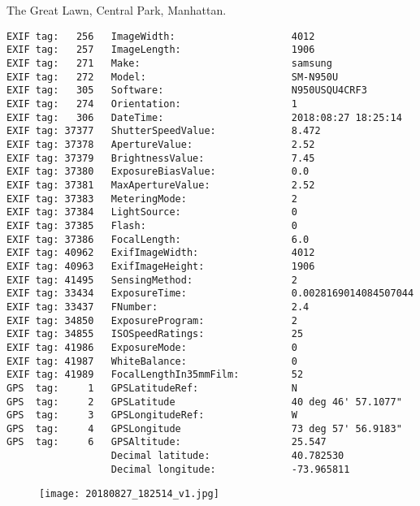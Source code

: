 \section{\protect{}}
\noindent The Great Lawn, Central Park, Manhattan.
\noindent
\begin{lstlisting}
EXIF tag:   256   ImageWidth:                    4012
EXIF tag:   257   ImageLength:                   1906
EXIF tag:   271   Make:                          samsung
EXIF tag:   272   Model:                         SM-N950U
EXIF tag:   305   Software:                      N950USQU4CRF3
EXIF tag:   274   Orientation:                   1
EXIF tag:   306   DateTime:                      2018:08:27 18:25:14
EXIF tag: 37377   ShutterSpeedValue:             8.472
EXIF tag: 37378   ApertureValue:                 2.52
EXIF tag: 37379   BrightnessValue:               7.45
EXIF tag: 37380   ExposureBiasValue:             0.0
EXIF tag: 37381   MaxApertureValue:              2.52
EXIF tag: 37383   MeteringMode:                  2
EXIF tag: 37384   LightSource:                   0
EXIF tag: 37385   Flash:                         0
EXIF tag: 37386   FocalLength:                   6.0
EXIF tag: 40962   ExifImageWidth:                4012
EXIF tag: 40963   ExifImageHeight:               1906
EXIF tag: 41495   SensingMethod:                 2
EXIF tag: 33434   ExposureTime:                  0.0028169014084507044
EXIF tag: 33437   FNumber:                       2.4
EXIF tag: 34850   ExposureProgram:               2
EXIF tag: 34855   ISOSpeedRatings:               25
EXIF tag: 41986   ExposureMode:                  0
EXIF tag: 41987   WhiteBalance:                  0
EXIF tag: 41989   FocalLengthIn35mmFilm:         52
GPS  tag:     1   GPSLatitudeRef:                N
GPS  tag:     2   GPSLatitude                    40 deg 46' 57.1077"
GPS  tag:     3   GPSLongitudeRef:               W
GPS  tag:     4   GPSLongitude                   73 deg 57' 56.9183"
GPS  tag:     6   GPSAltitude:                   25.547
                  Decimal latitude:              40.782530
                  Decimal longitude:             -73.965811

\end{lstlisting}
\clearpage
\begin{figure}
\raggedleft
\texttt{[image: 20180827\_182514\_v1.jpg]}
\end{figure}


\clearpage
